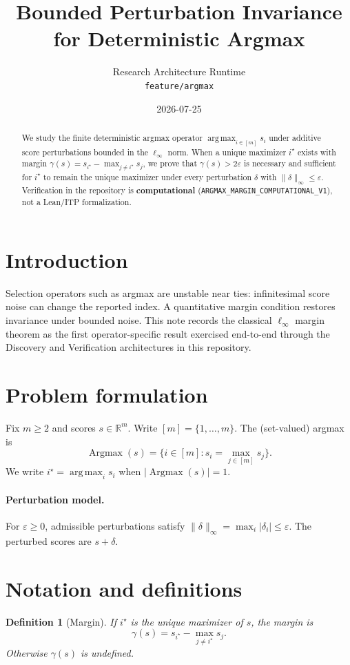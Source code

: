 \documentclass[11pt]{article}
\title{Bounded Perturbation Invariance for Deterministic Argmax}
\author{Research Architecture Runtime \\ \texttt{feature/argmax}}
\date{2026-07-25}
\newtheorem{definition}[theorem]{Definition}
\begin{document}
\maketitle

\begin{abstract}
We study the finite deterministic argmax operator
\(\operatorname*{arg\,max}_{i\in[m]} s_i\) under additive score perturbations
bounded in the \(\ell_\infty\) norm.
When a unique maximizer \(i^\star\) exists with margin
\(\gamma(s)=s_{i^\star}-\max_{j\neq i^\star}s_j\), we prove that
\(\gamma(s)>2\varepsilon\) is necessary and sufficient for \(i^\star\) to remain
the unique maximizer under every perturbation \(\delta\) with
\(\|\delta\|_\infty\le\varepsilon\).
Verification in the repository is \textbf{computational}
(\texttt{ARGMAX\_MARGIN\_COMPUTATIONAL\_V1}), not a Lean/ITP formalization.
\end{abstract}

\section{Introduction}
Selection operators such as argmax are unstable near ties:
infinitesimal score noise can change the reported index.
A quantitative margin condition restores invariance under bounded noise.
This note records the classical \(\ell_\infty\) margin theorem as the first
operator-specific result exercised end-to-end through the Discovery and
Verification architectures in this repository.

\section{Problem formulation}
Fix \(m\ge 2\) and scores \(s\in\mathbb{R}^m\).
Write \([m]=\{1,\dots,m\}\).
The (set-valued) argmax is
\[
\operatorname*{Argmax}(s)=\bigl\{i\in[m]: s_i=\max_{j\in[m]} s_j\bigr\}.
\]
We write \(i^\star=\operatorname*{arg\,max}_i s_i\) when
\(\lvert\operatorname*{Argmax}(s)\rvert=1\).

\paragraph{Perturbation model.}
For \(\varepsilon\ge 0\), admissible perturbations satisfy
\(\|\delta\|_\infty=\max_i\lvert\delta_i\rvert\le\varepsilon\).
The perturbed scores are \(s+\delta\).

\section{Notation and definitions}
\begin{definition}[Margin]
If \(i^\star\) is the unique maximizer of \(s\), the margin is
\[
\gamma(s)=s_{i^\star}-\max_{j\neq i^\star}s_j.
\]
Otherwise \(\gamma(s)\) is undefined.
\end{definition}
\end{document}
